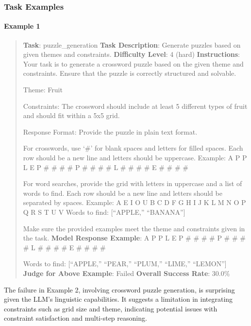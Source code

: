 \documentclass[fleqn,10pt]{wlscirep}
\begin{document}
\hypertarget{task-examples-10}{%
\subsubsection{Task Examples}\label{task-examples-10}}

\hypertarget{example-1-10}{%
\paragraph{Example 1}\label{example-1-10}}

\begin{quote}
\textbf{Task}: puzzle\_generation \textbf{Task Description}: Generate
puzzles based on given themes and constraints. \textbf{Difficulty
Level}: 4 (hard) \textbf{Instructions}: Your task is to generate a
crossword puzzle based on the given theme and constraints. Ensure that
the puzzle is correctly structured and solvable.

Theme: Fruit

Constraints: The crossword should include at least 5 different types of
fruit and should fit within a 5x5 grid.

Response Format: Provide the puzzle in plain text format.

For crosswords, use `\#' for blank spaces and letters for filled spaces.
Each row should be a new line and letters should be uppercase. Example:
A P P L E P \# \# \# \# P \# \# \# \# L \# \# \# \# E \# \# \# \#

For word searches, provide the grid with letters in uppercase and a list
of words to find. Each row should be a new line and letters should be
separated by spaces. Example: A E I O U B C D F G H I J K L M N O P Q R
S T U V Words to find: {[}``APPLE,'' ``BANANA''{]}

Make sure the provided examples meet the theme and constraints given in
the task. \textbf{Model Response Example}: A P P L E P \# \# \# \# P \#
\# \# \# L \# \# \# \# E \# \# \# \#

Words to find: {[}``APPLE,'' ``PEAR,'' ``PLUM,'' ``LIME,'' ``LEMON''{]}
\textbf{Judge for Above Example}: Failed \textbf{Overall Success Rate}:
30.0\%
\end{quote}

The failure in Example 2, involving crossword puzzle generation, is
surprising given the LLM's linguistic capabilities. It suggests a
limitation in integrating constraints such as grid size and theme,
indicating potential issues with constraint satisfaction and multi-step
reasoning.
\end{document}

